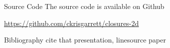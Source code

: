 \documentclass{beamer}
\begin{document}
    \begin{frame}{Source Code}
        The source code is available on Github

        \url{https://github.com/ckrisgarrett/closures-2d}
    \end{frame}

    \begin{frame}{Bibliography}
        cite that presentation, linesource paper
    \end{frame}
\end{document}
